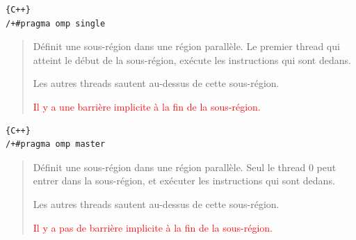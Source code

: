 \documentclass{beamer}
\begin{document}
\begin{frame}[fragile]

\vfill 
{}
\begin{lstlisting}{C++}
/+#pragma omp single
\end{lstlisting}

\begin{quote}
	Définit une sous-région dans une région parallèle. Le premier thread qui atteint le début de la sous-région, exécute les instructions qui sont dedans.
	
	Les autres threads sautent au-dessus de cette sous-région.
	
	\textcolor{red}{Il y a une barrière implicite à la fin de la sous-région.}	
\end{quote}
\begin{lstlisting}{C++}
/+#pragma omp master
\end{lstlisting}

\begin{quote}
	Définit une sous-région dans une région parallèle. Seul le thread 0 peut entrer dans la sous-région, et exécuter les instructions qui sont dedans.
	
	Les autres threads sautent au-dessus de cette sous-région.
	
	\textcolor{red}{Il y a pas de barrière implicite à la fin de la sous-région.} 
\end{quote}
\vfill 
\end{frame}
\end{document}
